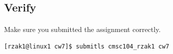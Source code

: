 \documentclass[letter,11pt]{article}
\begin{document}
\subsection*{Verify}
\paragraph{}Make sure you submitted the assignment correctly.
\begin{verbatim}
[rzak1@linux1 cw7]$ submitls cmsc104_rzak1 cw7
\end{verbatim}
\end{document}
